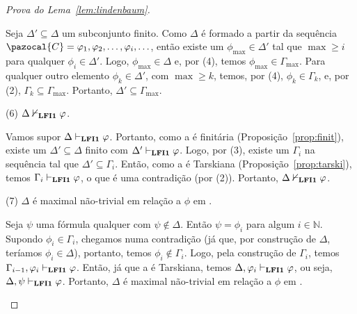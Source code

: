 \begin{proof}[Prova do Lema~\ref{lem:lindenbaum}]
\begin{adjustwidth}{1cm}{}
\begin{adjustwidth}{1cm}{}
                    Seja $\Delta' \subseteq \Delta$ um subconjunto finito. Como $\Delta$ é formado a partir da sequência $\pazocal{C} = \phi_1, \phi_2, \ldots, \phi_i, \ldots$, então existe um $\phi_{\max} \in \Delta'$ tal que $\max \geq i$ para qualquer $\phi_i \in \Delta'$. Logo, $\phi_{\max} \in \Delta$ e, por (4), temos $\phi_{\max} \in \Gamma_{\max}$. Para qualquer outro elemento $\phi_k \in \Delta'$, com $\max \geq k$, temos, por (4), $\phi_k \in \Gamma_k$, e, por (2), $\Gamma_k \subseteq \Gamma_{\max}$. Portanto, $\Delta' \subseteq \Gamma_{\max}$.

                \end{adjustwidth}


                \noindent(6) $\Delta \nvdash_{{\normalfont\textbf{LFI1}}{}} \varphi$.

                \begin{adjustwidth}{1cm}{}
                    Vamos supor $\Delta \vdash_{{\normalfont\textbf{LFI1}}{}} \varphi$. Portanto, como a \lfium{} é finitária (Proposição~\ref{prop:finit}), existe um $\Delta' \subseteq \Delta$ finito com $\Delta' \vdash_{{\normalfont\textbf{LFI1}}{}} \varphi$. Logo, por (3), existe um $\Gamma_i$ na sequência tal que $\Delta' \subseteq \Gamma_i$. Então, como a \lfium{} é Tarskiana (Proposição~\ref{prop:tarski}), temos $\Gamma_i \vdash_{{\normalfont\textbf{LFI1}}{}} \varphi$, o que é uma contradição (por (2)). Portanto, $\Delta \nvdash_{{\normalfont\textbf{LFI1}}{}} \varphi$.
                \end{adjustwidth}

                \noindent(7) $\Delta$ é maximal não-trivial em relação a $\phi$ em \lfium{}.
                
                \begin{adjustwidth}{1cm}{}
                    Seja $\psi$ uma fórmula qualquer com $\psi \not \in \Delta$. Então $\psi = \phi_i$ para algum $i \in \mathbb{N}$. Supondo $\phi_i \in \Gamma_i$, chegamos numa contradição (já que, por construção de $\Delta$, teríamos $\phi_i \in \Delta$), portanto, temos $\phi_i \not \in \Gamma_i$. Logo, pela construção de $\Gamma_i$, temos $\Gamma_{i - 1}, \varphi_i \vdash_{{\normalfont\textbf{LFI1}}{}} \varphi$. Então, já que a \lfium{} é Tarskiana, temos $\Delta, \varphi_i \vdash_{{\normalfont\textbf{LFI1}}{}} \varphi$, ou seja, $\Delta , \psi \vdash_{{\normalfont\textbf{LFI1}}{}} \varphi$. Portanto, $\Delta$ é maximal não-trivial em relação a $\phi$ em \lfium{}.

                \end{adjustwidth}


            \end{adjustwidth}
                
                
            \end{proof}
            
